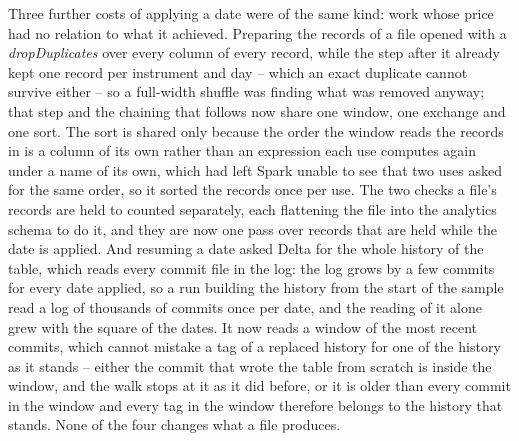 Three further costs of applying a date were of the same kind: work whose price had no relation to what it achieved. Preparing the records of a file opened with a \emph{dropDuplicates} over every column of every record, while the step after it already kept one record per instrument and day -- which an exact duplicate cannot survive either -- so a full-width shuffle was finding what was removed anyway; that step and the chaining that follows now share one window, one exchange and one sort. The sort is shared only because the order the window reads the records in is a column of its own rather than an expression each use computes again under a name of its own, which had left Spark unable to see that two uses asked for the same order, so it sorted the records once per use. The two checks a file's records are held to counted separately, each flattening the file into the analytics schema to do it, and they are now one pass over records that are held while the date is applied. And resuming a date asked Delta for the whole history of the table, which reads every commit file in the log: the log grows by a few commits for every date applied, so a run building the history from the start of the sample read a log of thousands of commits once per date, and the reading of it alone grew with the square of the dates. It now reads a window of the most recent commits, which cannot mistake a tag of a replaced history for one of the history as it stands -- either the commit that wrote the table from scratch is inside the window, and the walk stops at it as it did before, or it is older than every commit in the window and every tag in the window therefore belongs to the history that stands. None of the four changes what a file produces.

